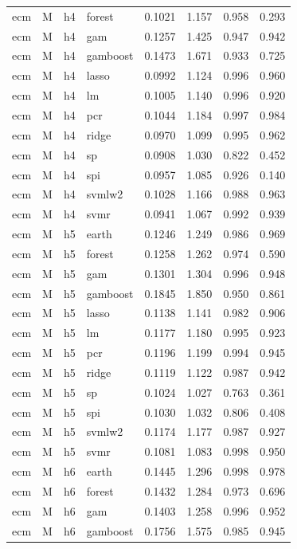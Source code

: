 \begin{ThreePartTable}
\begin{longtable}[t]{llclcccc}
ecm & M & h4 & forest & 0.1021 & 1.157 & 0.958 & 0.293\\
ecm & M & h4 & gam & 0.1257 & 1.425 & 0.947 & 0.942\\
ecm & M & h4 & gamboost & 0.1473 & 1.671 & 0.933 & 0.725\\
ecm & M & h4 & lasso & 0.0992 & 1.124 & 0.996 & 0.960\\
ecm & M & h4 & lm & 0.1005 & 1.140 & 0.996 & 0.920\\
ecm & M & h4 & pcr & 0.1044 & 1.184 & 0.997 & 0.984\\
ecm & M & h4 & ridge & 0.0970 & 1.099 & 0.995 & 0.962\\
ecm & M & h4 & sp & 0.0908 & 1.030 & 0.822 & 0.452\\
ecm & M & h4 & spi & 0.0957 & 1.085 & 0.926 & 0.140\\
ecm & M & h4 & svmlw2 & 0.1028 & 1.166 & 0.988 & 0.963\\
ecm & M & h4 & svmr & 0.0941 & 1.067 & 0.992 & 0.939\\
\addlinespace
ecm & M & h5 & earth & 0.1246 & 1.249 & 0.986 & 0.969\\
ecm & M & h5 & forest & 0.1258 & 1.262 & 0.974 & 0.590\\
ecm & M & h5 & gam & 0.1301 & 1.304 & 0.996 & 0.948\\
ecm & M & h5 & gamboost & 0.1845 & 1.850 & 0.950 & 0.861\\
ecm & M & h5 & lasso & 0.1138 & 1.141 & 0.982 & 0.906\\
ecm & M & h5 & lm & 0.1177 & 1.180 & 0.995 & 0.923\\
ecm & M & h5 & pcr & 0.1196 & 1.199 & 0.994 & 0.945\\
ecm & M & h5 & ridge & 0.1119 & 1.122 & 0.987 & 0.942\\
ecm & M & h5 & sp & 0.1024 & 1.027 & 0.763 & 0.361\\
ecm & M & h5 & spi & 0.1030 & 1.032 & 0.806 & 0.408\\
ecm & M & h5 & svmlw2 & 0.1174 & 1.177 & 0.987 & 0.927\\
ecm & M & h5 & svmr & 0.1081 & 1.083 & 0.998 & 0.950\\
\addlinespace
ecm & M & h6 & earth & 0.1445 & 1.296 & 0.998 & 0.978\\
ecm & M & h6 & forest & 0.1432 & 1.284 & 0.973 & 0.696\\
ecm & M & h6 & gam & 0.1403 & 1.258 & 0.996 & 0.952\\
ecm & M & h6 & gamboost & 0.1756 & 1.575 & 0.985 & 0.945\\

\end{longtable}
\end{ThreePartTable}
